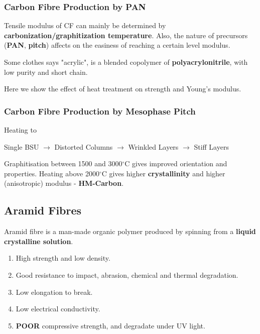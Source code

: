 \documentclass{NoteThesis/note-thesis}
\begin{document}

\subsubsection*{Carbon Fibre Production by PAN}

Tensile modulus of CF can mainly be determined by \textbf{carbonization/graphitization temperature}. Also, the nature of precursors (\textbf{PAN}, \textbf{pitch}) affects on the easiness of reaching a certain level modulus.

Some clothes says "acrylic", is a blended copolymer of \textbf{polyacrylonitrile}, with low purity and short chain.

Here we show the effect of heat treatment on strength and Young's modulus.


\subsubsection*{Carbon Fibre Production by Mesophase Pitch}

Heating to 
\begin{center}
    Single BSU $\to$ Distorted Columns $\to$ Wrinkled Layers $\to$ Stiff Layers
\end{center}


Graphitisation between 1500 and 3000$^\circ \text{C}$ gives improved orientation and properties. Heating above 2000$^\circ \text{C}$ gives higher \textbf{crystallinity} and higher (anisotropic) modulus - \textbf{HM-Carbon}.

\subsection{Aramid Fibres}

Aramid fibre is a man-made organic polymer produced by spinning from a \textbf{liquid crystalline solution}.

\begin{enumerate}
    \item High strength and low density.
    \item Good resistance to impact, abrasion, chemical and thermal degradation.
    \item Low elongation to break.
    \item Low electrical conductivity.
    \item \textbf{POOR} compressive strength, and degradate under UV light.
\end{enumerate}
\end{document}
